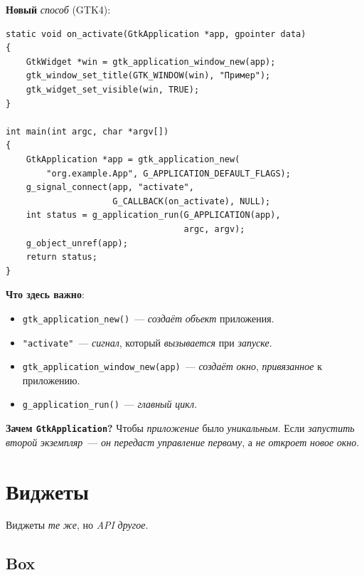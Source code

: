 \textbf{Новый} \emph{способ} (GTK4):
\begin{listing}[htbp]
\begin{verbatim}
static void on_activate(GtkApplication *app, gpointer data)
{
    GtkWidget *win = gtk_application_window_new(app);
    gtk_window_set_title(GTK_WINDOW(win), "Пример");
    gtk_widget_set_visible(win, TRUE);
}

int main(int argc, char *argv[])
{
    GtkApplication *app = gtk_application_new(
        "org.example.App", G_APPLICATION_DEFAULT_FLAGS);
    g_signal_connect(app, "activate",
                     G_CALLBACK(on_activate), NULL);
    int status = g_application_run(G_APPLICATION(app),
                                   argc, argv);
    g_object_unref(app);
    return status;
}
\end{verbatim}
\caption{Запуск в GTK4}
\label{lst:gtk4-main}
\end{listing}

\textbf{Что здесь важно}:
\begin{itemize}
    \item \texttt{gtk\_application\_new()}~--- \emph{создаёт}
          \emph{объект} приложения.
    \item \texttt{"activate"}~--- \emph{сигнал}, который
          \emph{вызывается} при \emph{запуске}.
    \item \texttt{gtk\_application\_window\_new(app)}~---
          \emph{создаёт} \emph{окно}, \emph{привязанное}
          к приложению.
    \item \texttt{g\_application\_run()}~--- \emph{главный}
          \emph{цикл}.
\end{itemize}

\begin{ideabox}
\textbf{Зачем \texttt{GtkApplication}?} Чтобы \emph{приложение}
было \emph{уникальным}. Если \emph{запустить} \emph{второй}
\emph{экземпляр}~--- \emph{он} \emph{передаст}
\emph{управление} \emph{первому}, а \emph{не} \emph{откроет}
\emph{новое} \emph{окно}.
\end{ideabox}

\section{Виджеты}
\label{sec:gtk4-widgets}

Виджеты \emph{те} \emph{же}, но \emph{API} \emph{другое}.

\subsection{Box}

